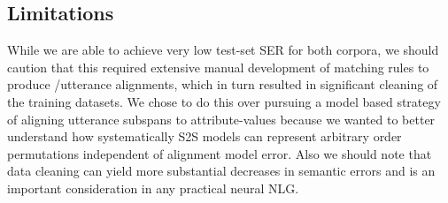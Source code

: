 \subsection{Limitations}

While we are able to achieve very low test-set SER for both corpora, we should
caution that this required extensive manual development of matching rules to
produce \meaningrepresentation/utterance alignments, which in turn resulted in
significant cleaning of the training datasets. We chose to do this over
pursuing a model based strategy of aligning utterance subspans to
attribute-values because we wanted to better understand how systematically S2S
models can represent arbitrary order permutations independent of alignment
model error.  Also we should note that data cleaning can yield more substantial
decreases in semantic errors \citep{dusek2019,wang2019} and is an important
consideration in any practical neural NLG.
